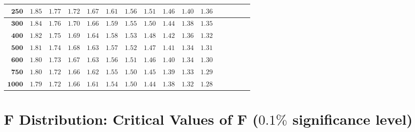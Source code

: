 \begin{alternateColorTable}
\begin{longtable}{|r|r|r|r|r|r|r|r|r|r|r|r|r|r|r|r|}
    \(\mathbf{250}\) & \(1.85\) & \(1.77\) & \(1.72\) & \(1.67\) & \(1.61\) & \(1.56\) & \(1.51\) & \(1.46\) & \(1.40\) & \(1.36\) \\  \hline 
    \(\mathbf{300}\) & \(1.84\) & \(1.76\) & \(1.70\) & \(1.66\) & \(1.59\) & \(1.55\) & \(1.50\) & \(1.44\) & \(1.38\) & \(1.35\) \\  \hline 
    \(\mathbf{400}\) & \(1.82\) & \(1.75\) & \(1.69\) & \(1.64\) & \(1.58\) & \(1.53\) & \(1.48\) & \(1.42\) & \(1.36\) & \(1.32\) \\  \hline 
    \(\mathbf{500}\) & \(1.81\) & \(1.74\) & \(1.68\) & \(1.63\) & \(1.57\) & \(1.52\) & \(1.47\) & \(1.41\) & \(1.34\) & \(1.31\) \\  \hline 
    \(\mathbf{600}\) & \(1.80\) & \(1.73\) & \(1.67\) & \(1.63\) & \(1.56\) & \(1.51\) & \(1.46\) & \(1.40\) & \(1.34\) & \(1.30\) \\  \hline 
    \(\mathbf{750}\) & \(1.80\) & \(1.72\) & \(1.66\) & \(1.62\) & \(1.55\) & \(1.50\) & \(1.45\) & \(1.39\) & \(1.33\) & \(1.29\) \\  \hline 
    \(\mathbf{1000}\) & \(1.79\) & \(1.72\) & \(1.66\) & \(1.61\) & \(1.54\) & \(1.50\) & \(1.44\) & \(1.38\) & \(1.32\) & \(1.28\) \\ \hline

\end{longtable}
\end{alternateColorTable}
\changefontsizes{11pt}


\newpage

\section{F Distribution: Critical Values of F ($0.1\%$ significance level)}


\setlength{\LTleft}{-1.5cm} %
\setlength{\LTright}{-1.5cm} %

